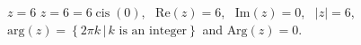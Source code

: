 { $z = 6$}
{ $z =6 = 6\operatorname{cis}\left(0\right)$, \, $\text{Re}(z) = 6$, \, $\text{Im}(z) = 0$, \, $|z| = 6$, \, $\text{arg}(z) = \left\{2\pi k \, | \, \text{$k$ is an integer} \right\}$ and $\text{Arg}(z) =0$.}

